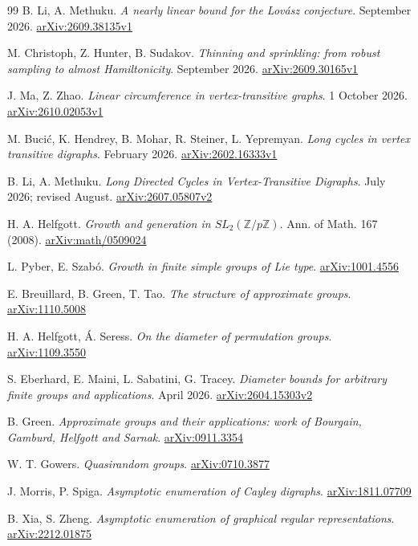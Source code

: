 \begin{thebibliography}{99}
 B. Li, A. Methuku. \emph{A nearly linear bound for the Lov\'asz conjecture}. September 2026. \href{https://arxiv.org/abs/2609.38135v1}{arXiv:2609.38135v1}

 M. Christoph, Z. Hunter, B. Sudakov. \emph{Thinning and sprinkling: from robust sampling to almost Hamiltonicity}. September 2026. \href{https://arxiv.org/abs/2609.30165v1}{arXiv:2609.30165v1}

 J. Ma, Z. Zhao. \emph{Linear circumference in vertex-transitive graphs}. 1 October 2026. \href{https://arxiv.org/abs/2610.02053v1}{arXiv:2610.02053v1}

 M. Buci\'c, K. Hendrey, B. Mohar, R. Steiner, L. Yepremyan. \emph{Long cycles in vertex transitive digraphs}. February 2026. \href{https://arxiv.org/abs/2602.16333v1}{arXiv:2602.16333v1}

 B. Li, A. Methuku. \emph{Long Directed Cycles in Vertex-Transitive Digraphs}. July 2026; revised August. \href{https://arxiv.org/abs/2607.05807v2}{arXiv:2607.05807v2}

 H. A. Helfgott. \emph{Growth and generation in $SL_2(\mathbb Z/p\mathbb Z)$}. Ann. of Math. 167 (2008). \href{https://arxiv.org/abs/math/0509024}{arXiv:math/0509024}

 L. Pyber, E. Szab\'o. \emph{Growth in finite simple groups of Lie type}. \href{https://arxiv.org/abs/1001.4556}{arXiv:1001.4556}

 E. Breuillard, B. Green, T. Tao. \emph{The structure of approximate groups}. \href{https://arxiv.org/abs/1110.5008}{arXiv:1110.5008}

 H. A. Helfgott, \'A. Seress. \emph{On the diameter of permutation groups}. \href{https://arxiv.org/abs/1109.3550}{arXiv:1109.3550}

 S. Eberhard, E. Maini, L. Sabatini, G. Tracey. \emph{Diameter bounds for arbitrary finite groups and applications}. April 2026. \href{https://arxiv.org/abs/2604.15303v2}{arXiv:2604.15303v2}

 B. Green. \emph{Approximate groups and their applications: work of Bourgain, Gamburd, Helfgott and Sarnak}. \href{https://arxiv.org/abs/0911.3354}{arXiv:0911.3354}

 W. T. Gowers. \emph{Quasirandom groups}. \href{https://arxiv.org/abs/0710.3877}{arXiv:0710.3877}

 J. Morris, P. Spiga. \emph{Asymptotic enumeration of Cayley digraphs}. \href{https://arxiv.org/abs/1811.07709}{arXiv:1811.07709}

 B. Xia, S. Zheng. \emph{Asymptotic enumeration of graphical regular representations}. \href{https://arxiv.org/abs/2212.01875}{arXiv:2212.01875}

\end{thebibliography}
